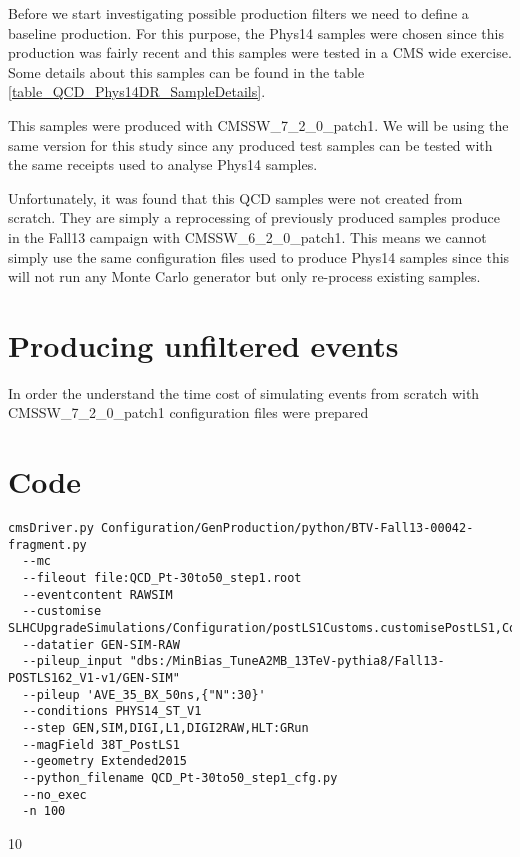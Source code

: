 \documentclass[a4paper]{article}
\begin{document}
Before we start investigating possible production filters we need to define a baseline production. For this purpose, the Phys14 samples were chosen since this production was fairly recent and this samples were tested in a CMS wide exercise. Some details about this samples can be found in the table \ref{table_QCD_Phys14DR_SampleDetails}.



This samples were produced with CMSSW\_7\_2\_0\_patch1. We will be using the same version for this study since any produced test samples can be tested with the same receipts used to analyse Phys14 samples.

Unfortunately, it was found that this QCD samples were not created from scratch. They are simply a reprocessing of previously produced samples produce in the Fall13 campaign with CMSSW\_6\_2\_0\_patch1. This means we cannot simply use the same configuration files used to produce Phys14 samples since this will not run any Monte Carlo generator but only re-process existing samples.  

\section{Producing unfiltered events}

In order the understand the time cost of simulating events from scratch with CMSSW\_7\_2\_0\_patch1 configuration files were prepared 

\newpage
\appendix

\section{Code}
\lstset{
  language=bash,
  basicstyle=\footnotesize, 
  breaklines=true
}
\begin{lstlisting}
cmsDriver.py Configuration/GenProduction/python/BTV-Fall13-00042-fragment.py 
  --mc 
  --fileout file:QCD_Pt-30to50_step1.root 
  --eventcontent RAWSIM 
  --customise SLHCUpgradeSimulations/Configuration/postLS1Customs.customisePostLS1,Configuration/StandardSequences/SimWithCastor_cff.customise 
  --datatier GEN-SIM-RAW 
  --pileup_input "dbs:/MinBias_TuneA2MB_13TeV-pythia8/Fall13-POSTLS162_V1-v1/GEN-SIM" 
  --pileup 'AVE_35_BX_50ns,{"N":30}' 
  --conditions PHYS14_ST_V1 
  --step GEN,SIM,DIGI,L1,DIGI2RAW,HLT:GRun 
  --magField 38T_PostLS1 
  --geometry Extended2015 
  --python_filename QCD_Pt-30to50_step1_cfg.py 
  --no_exec 
  -n 100
\end{lstlisting}

\newpage
\begin{thebibliography}{10}


\end{thebibliography}
\end{document}

